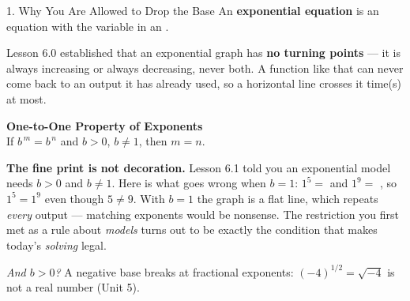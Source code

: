\documentclass[10pt]{article}
\begin{document}
\begin{notesbox}{1. Why You Are Allowed to Drop the Base}
An \textbf{exponential equation} is an equation with the variable in an .

\vspace{4pt}
Lesson 6.0 established that an exponential graph has \textbf{no turning points} --- it is always
increasing or always decreasing, never both. A function like that can never come back to an output it
has already used, so a horizontal line crosses it  time(s) at most.

\vspace{4pt}
\begin{center}
\begin{tcolorbox}[colback=goldbg, colframe=goldacc, boxrule=0.8pt, arc=1.5mm, width=0.90\linewidth,
    left=3mm, right=3mm, top=2mm, bottom=2mm]
\centering
\textbf{One-to-One Property of Exponents} \\[3pt]
If \; $b^{\,m} = b^{\,n}$ \; and \; $b>0$, $b\neq1$, \qquad then \; $m=n$.
\end{tcolorbox}
\end{center}

\vspace{2pt}
\textbf{The fine print is not decoration.} Lesson 6.1 told you an exponential model needs $b>0$ and
$b\neq1$. Here is what goes wrong when $b=1$: \; $1^{5}=$  \; and \; $1^{9}=$
, \; so $1^{5}=1^{9}$ even though $5\neq9$. With $b=1$ the graph is a flat line, which
repeats \emph{every} output --- matching exponents would be nonsense. The restriction you first met as
a rule about \emph{models} turns out to be exactly the condition that makes today's \emph{solving}
legal.

\vspace{3pt}
\emph{And $b>0$?} A negative base breaks at fractional exponents: $(-4)^{1/2}=\sqrt{-4}$ is not a real
number (Unit 5).
\end{notesbox}
\end{document}
